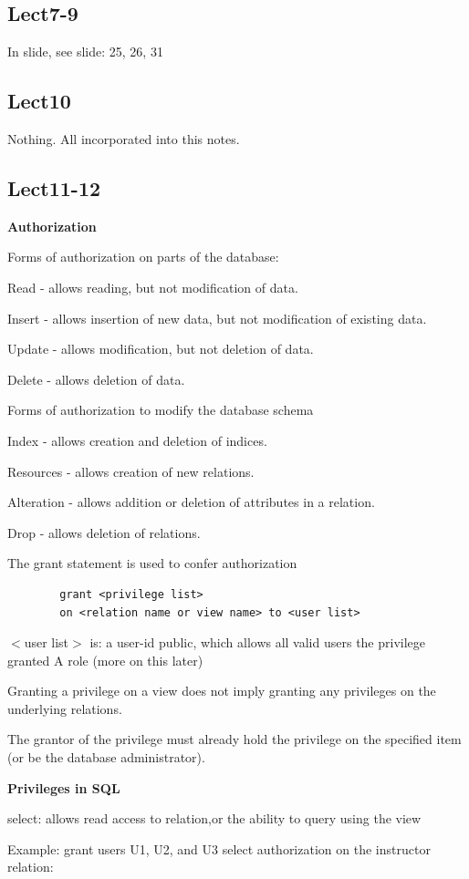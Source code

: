 \documentclass[8pt, a4paper, oneside, twocolumn]{extarticle}
\begin{document}
\subsection{Lect7-9}
In slide, see slide: 25, 26, 31
\subsection{Lect10}
Nothing. All incorporated into this notes.
\subsection{Lect11-12}
\textbf{Authorization}

Forms of authorization on parts of  the database:

Read - allows reading, but not modification of data.

Insert - allows insertion of new data, but not modification of existing data.

Update - allows modification, but not deletion of data.

Delete - allows deletion of data.

Forms of authorization to modify the database schema

Index - allows creation and deletion of indices.

Resources - allows creation of new relations.

Alteration - allows addition or deletion of attributes in a relation.

Drop - allows deletion of relations.

The grant statement is used to confer authorization

\begin{verbatim}
        grant <privilege list>
        on <relation name or view name> to <user list>
\end{verbatim}
$<$user list$>$ is:
a user-id
public, which allows all valid users the privilege granted
A role (more on this later)

Granting a privilege on a view does not imply granting any privileges on the underlying relations.

The grantor of the privilege must already hold the privilege on the specified item (or be the database administrator).

\textbf{Privileges in SQL}

select: allows read access to relation,or the ability to query using the view

Example: grant users U1, U2, and U3 select authorization on the instructor relation:
\end{document}
